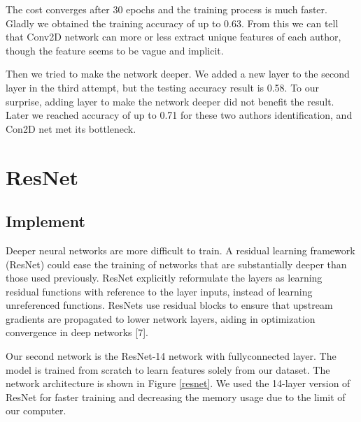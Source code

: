 \documentclass{article}
\begin{document}

The cost converges after 30 epochs and the training process is much faster. Gladly we obtained the training accuracy of up to 0.63. From this we can tell that Conv2D network can more or less  extract unique features of each author, though the feature seems to be vague and implicit.

Then we tried to make the network deeper. We added a new layer to the second layer in the third attempt, but the testing accuracy result is 0.58. To our surprise, adding layer to make the network deeper did not benefit the result. Later we reached accuracy of up to 0.71 for these two authors identification, and Con2D net met its bottleneck.



\section{ResNet}
\subsection{Implement}

Deeper neural networks are more difficult to train. A residual learning framework (ResNet) could ease the training of networks that are substantially deeper than those used previously. ResNet explicitly reformulate the layers as learning residual functions with reference to the layer inputs, instead of learning unreferenced functions. ResNets use residual blocks to ensure that upstream gradients are propagated to lower network layers, aiding in optimization convergence in deep networks [7].


Our second network is the ResNet-14 network with fullyconnected layer. The model is trained from scratch to learn features solely from our dataset.     The network architecture is shown in Figure \ref{resnet}. We used the 14-layer version of ResNet for faster training and decreasing the memory usage due to the limit of our computer.
\end{document}
